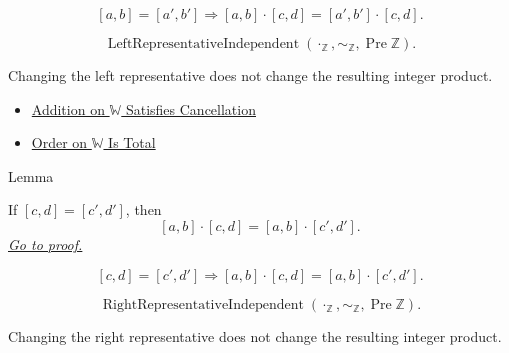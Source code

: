 \begin{remark*}
\[
[a,b]=[a',b']
\Longrightarrow
[a,b]\cdot[c,d]=[a',b']\cdot[c,d].
\]
\end{remark*}

\begin{remark*}
\[
\operatorname{LeftRepresentativeIndependent}(\cdot_{\mathbb{Z}},\sim_{\mathbb{Z}},\operatorname{Pre}\mathbb{Z}).
\]
\end{remark*}

\begin{remark*}[Interpretation]
Changing the left representative does not change the resulting integer
product.
\end{remark*}

\begin{dependencies}
\begin{itemize}
  \item \hyperref[thm:addition-on-w-cancellation]{Addition on $\mathbb{W}$ Satisfies Cancellation}
  \item \hyperref[thm:order-on-w-total]{Order on $\mathbb{W}$ Is Total}
\end{itemize}
\end{dependencies}

\begin{lemmabox}{Lemma}
\begin{lemma}
\label{lem:multiplication-on-z-classes-respects-right-equivalence}
If $[c,d]=[c',d']$, then
\[
[a,b]\cdot[c,d]=[a,b]\cdot[c',d'].
\]
\hyperref[prf:multiplication-on-z-classes-respects-right-equivalence]{\textit{Go to proof.}}
\end{lemma}
\end{lemmabox}

\begin{remark*}
\[
[c,d]=[c',d']
\Longrightarrow
[a,b]\cdot[c,d]=[a,b]\cdot[c',d'].
\]
\end{remark*}

\begin{remark*}
\[
\operatorname{RightRepresentativeIndependent}(\cdot_{\mathbb{Z}},\sim_{\mathbb{Z}},\operatorname{Pre}\mathbb{Z}).
\]
\end{remark*}

\begin{remark*}[Interpretation]
Changing the right representative does not change the resulting integer
product.
\end{remark*}


